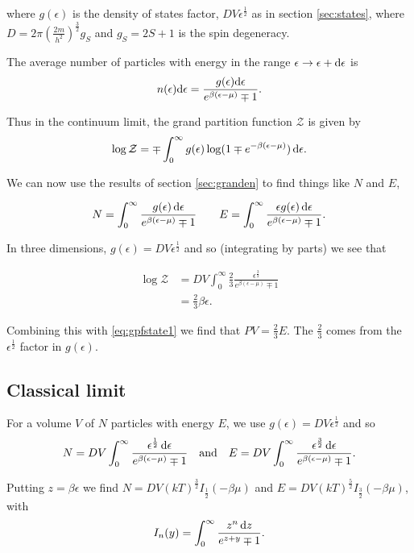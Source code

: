 \documentclass{notes}
\newcommand{\cZ}{\mathcal{Z}}
\begin{document}
where $g(\epsilon)$ is the density of states factor, $D V
\epsilon^{\frac{1}{2}}$ as in section \ref{sec:states},
where $D = 2 \pi \left( \frac{2 m}{h^2} \right)^{\frac{3}{2}} g_S$
and $g_S = 2 S + 1$ is the spin degeneracy.

The average number of particles with energy in the range
$\epsilon \to \epsilon + \mathrm{d} \epsilon$ is
\[
n(\epsilon) \mathrm{d} \epsilon = \frac{g(\epsilon) \mathrm{d} \epsilon}{e^{\beta
(\epsilon-\mu)} \mp 1}.
\]

Thus in the continuum limit, the grand partition function $\cZ$ is
given by
\[
\log \cZ = \mp \int_0^\infty g(\epsilon) \log (1 \mp
e^{-\beta(\epsilon - \mu)})\, \ud \epsilon.
\]

We can now use the results of section \ref{sec:granden}
to find things like $N$ and $E$,

\[
N = \int_0^\infty \frac{g(\epsilon)\, \mathrm{d} \epsilon}{e^{\beta(\epsilon
- \mu)} \mp 1} \qquad
E = \int_0^\infty \frac{\epsilon g(\epsilon)\, \mathrm{d} \epsilon}
{e^{\beta(\epsilon- \mu)} \mp 1}.
\]

In three dimensions, $g(\epsilon) = D V \epsilon^{\frac{1}{2}}$
and so (integrating by parts) we see that

\begin{align*}
\log \cZ &= D V \int_0^\infty \frac{2}{3} \frac{\epsilon^{\frac{3}{2}}}{
e^{\beta(\epsilon - \mu)} \mp 1} \\
&= \frac{2}{3} \beta \epsilon.
\end{align*}

Combining this with \eqref{eq:gpfstate1} we find that
$P V = \tfrac{2}{3} E$.  The $\tfrac{2}{3}$ comes from the
$\epsilon^{\frac{1}{2}}$ factor in $g(\epsilon)$.

\subsection{Classical limit}

For a volume $V$ of $N$ particles with energy $E$,
we use $g(\epsilon) = D V \epsilon^{\frac{1}{2}}$
and so
\[
N = D V \int_0^\infty \frac{\epsilon^{\frac{1}{2}}\, \mathrm{d} \epsilon}{
e^{\beta(\epsilon - \mu)} \mp 1} \quad \text{and} \quad
E = D V \int_0^\infty \frac{\epsilon^{\frac{3}{2}}\, \mathrm{d} \epsilon}{
e^{\beta(\epsilon - \mu)} \mp 1}.
\]

Putting $z = \beta \epsilon$ we find
$N = D V ( k T)^{\frac{3}{2}} I_{\frac{1}{2}}(-\beta \mu)$ and
$E = DV (k T)^{\frac{5}{2}} I_{\frac{3}{2}}(-\beta \mu)$,
with
\[
I_n(y) = \int_0^\infty \frac{z^n\, \mathrm{d} z}{e^{z+y} \mp 1}.
\]
\end{document}
